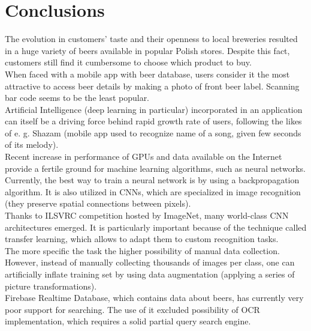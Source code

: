 \documentclass[11pt]{article}
\begin{document}
\section{Conclusions} \label{conclusions}
The evolution in customers' taste and their openness to local breweries resulted in a huge variety of beers available in popular Polish stores. Despite this fact, customers still find it cumbersome to choose which product to buy.\\

When faced with a mobile app with beer database, users consider it the most attractive to access beer details by making a photo of front beer label. Scanning bar code seems to be the least popular.\\

Artificial Intelligence (deep learning in particular) incorporated in an application can itself be a driving force behind rapid growth rate of users, following the likes of e. g. Shazam (mobile app used to recognize name of a song, given few seconds of its melody).\\

Recent increase in performance of GPUs and data available on the Internet provide a fertile ground for machine learning algorithms, such as neural networks.\\

Currently, the best way to train a neural network is by using a backpropagation algorithm. It is also utilized in CNNs, which are specialized in image recognition (they preserve spatial connections between pixels).\\

Thanks to ILSVRC competition hosted by ImageNet, many world-class CNN architectures emerged. It is particularly important because of the technique called transfer learning, which allows to adapt them to custom recognition tasks.\\

The more specific the task the higher possibility of manual data collection. However, instead of manually collecting thousands of images per class, one can artificially inflate training set by using data augmentation (applying a series of picture transformations).\\

Firebase Realtime Database, which contains data about beers, has currently very poor support for searching. The use of it excluded possibility of OCR implementation, which requires a solid partial query search engine.\\
\end{document}
